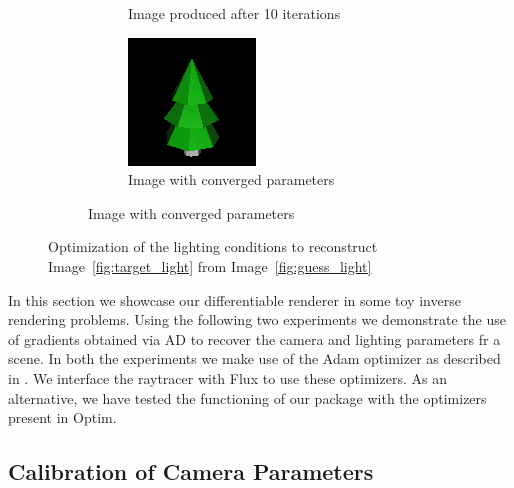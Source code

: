 \documentclass{juliacon}
\begin{document}
\begin{figure}[!htb]
\begin{subfigure}[b]{0.45\textwidth}
\begin{subfigure}[b]{0.4\textwidth}
            \caption{Image produced after 10 iterations}
        \end{subfigure}
        \hfill
        \begin{subfigure}[b]{0.4\textwidth}
            \centering
            \includegraphics[width=\textwidth]{images/light/501.png}
            \caption{Image with converged parameters}
        \end{subfigure}
    \end{subfigure}
    \caption{Optimization of the lighting conditions to reconstruct Image~\ref{fig:target_light} from Image~\ref{fig:guess_light}}
    \label{fig:light_position}
\end{figure}

In this section we showcase our differentiable renderer in some toy inverse rendering problems. Using the following two experiments we demonstrate the use of gradients obtained via AD to recover the camera and lighting parameters fr a scene. In both the experiments we make use of the Adam optimizer as described in \cite{kingma2014adam}. We interface the raytracer with Flux to use these optimizers. As an alternative, we have tested the functioning of our package with the optimizers present in Optim.

\subsection{\textbf{Calibration of Camera Parameters}}
\label{sec:calcam}
\end{document}
